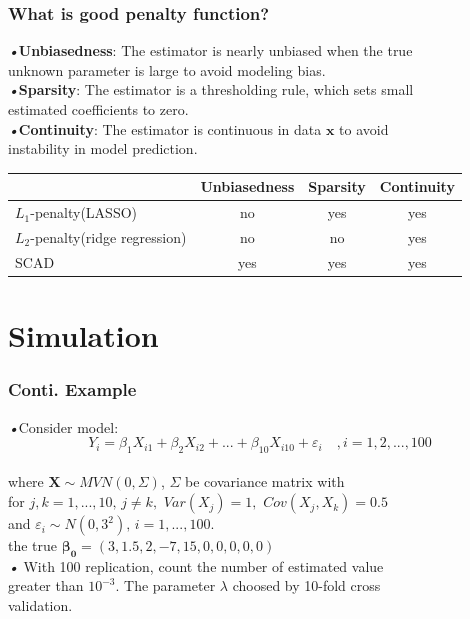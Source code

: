 \documentclass{beamer}
\begin{document}
    \begin{frame}
    \frametitle{What is good penalty function?}
    \emph{•}{\bf{Unbiasedness}}: The estimator is nearly unbiased when the true 
    \\\quad unknown parameter is large to avoid modeling bias.
    \\\emph{•}{\bf{Sparsity}}: The estimator is a thresholding rule, which sets small
    \\\quad estimated coefficients to zero.
    \\\emph{•}{\bf{Continuity}}: The estimator is continuous in data $\boldsymbol{x}$ to avoid
    \\\quad instability in model prediction. 
\end{frame}
    
    \begin{frame}
      \begin{tabular}[t]{|l|c|c|c|}
	\hline
	                                & Unbiasedness  & Sparsity & Continuity \\
	 \hline  
	$L_1$-penalty(LASSO)               & no            & yes      & yes \\
	$L_2$-penalty(ridge regression)    & no            & no       & yes \\      
	 SCAD                           & yes           & yes      & yes \\
	 \hline
	  \end{tabular}
    \end{frame}
\section{Simulation}
\begin{frame}
\frametitle{Conti. Example}
\emph{•}Consider model: 
\begin{equation*}
Y_i =  \beta_1 X_{i1} +\beta_2 X_{i2} +...+\beta_{10} X_{i10}  + \varepsilon_i \quad , i=1,2,...,100
\end{equation*} 
\\\quad where $\mathbf{X} \sim MVN(0 ,\Sigma)$, $\Sigma$ be covariance matrix with 
\\\quad for $j , k = 1,...,10,\, j \neq k,$ $Var(X_j) = 1,$ $Cov(X_j,X_k) = 0.5 $ 
\\\quad and $\varepsilon_i \sim N(0,3^2), \,i=1,...,100$.
\\\quad the true $\boldsymbol{\beta_0}=(3 , 1.5 , 2 , -7 , 15 ,0 ,0 , 0 , 0 ,0)$    
\\\emph{•} With 100 replication, count the number of estimated value 
\\\quad greater than $10^{-3}$. The parameter $\lambda$ choosed by 10-fold cross
\\\quad validation.  

\end{frame}
\end{document}
